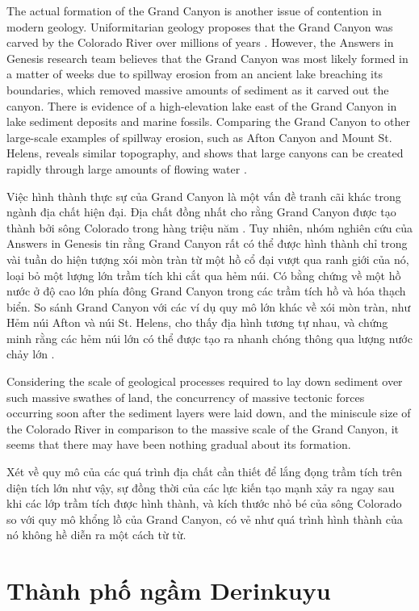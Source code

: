 \documentclass[10pt,twocolumn,letterpaper]{article}
\begin{document}
The actual formation of the Grand Canyon is another issue of contention in modern geology. Uniformitarian geology proposes that the Grand Canyon was carved by the Colorado River over millions of years \cite{47}. However, the Answers in Genesis research team believes that the Grand Canyon was most likely formed in a matter of weeks due to spillway erosion from an ancient lake breaching its boundaries, which removed massive amounts of sediment as it carved out the canyon. There is evidence of a high-elevation lake east of the Grand Canyon in lake sediment deposits and marine fossils. Comparing the Grand Canyon to other large-scale examples of spillway erosion, such as Afton Canyon and Mount St. Helens, reveals similar topography, and shows that large canyons can be created rapidly through large amounts of flowing water \cite{48}.

Việc hình thành thực sự của Grand Canyon là một vấn đề tranh cãi khác trong ngành địa chất hiện đại. Địa chất đồng nhất cho rằng Grand Canyon được tạo thành bởi sông Colorado trong hàng triệu năm \cite{47}. Tuy nhiên, nhóm nghiên cứu của Answers in Genesis tin rằng Grand Canyon rất có thể được hình thành chỉ trong vài tuần do hiện tượng xói mòn tràn từ một hồ cổ đại vượt qua ranh giới của nó, loại bỏ một lượng lớn trầm tích khi cắt qua hẻm núi. Có bằng chứng về một hồ nước ở độ cao lớn phía đông Grand Canyon trong các trầm tích hồ và hóa thạch biển. So sánh Grand Canyon với các ví dụ quy mô lớn khác về xói mòn tràn, như Hẻm núi Afton và núi St. Helens, cho thấy địa hình tương tự nhau, và chứng minh rằng các hẻm núi lớn có thể được tạo ra nhanh chóng thông qua lượng nước chảy lớn \cite{48}.

Considering the scale of geological processes required to lay down sediment over such massive swathes of land, the concurrency of massive tectonic forces occurring soon after the sediment layers were laid down, and the miniscule size of the Colorado River in comparison to the massive scale of the Grand Canyon, it seems that there may have been nothing gradual about its formation.

Xét về quy mô của các quá trình địa chất cần thiết để lắng đọng trầm tích trên diện tích lớn như vậy, sự đồng thời của các lực kiến tạo mạnh xảy ra ngay sau khi các lớp trầm tích được hình thành, và kích thước nhỏ bé của sông Colorado so với quy mô khổng lồ của Grand Canyon, có vẻ như quá trình hình thành của nó không hề diễn ra một cách từ từ.

\section{Thành phố ngầm Derinkuyu}
\end{document}
